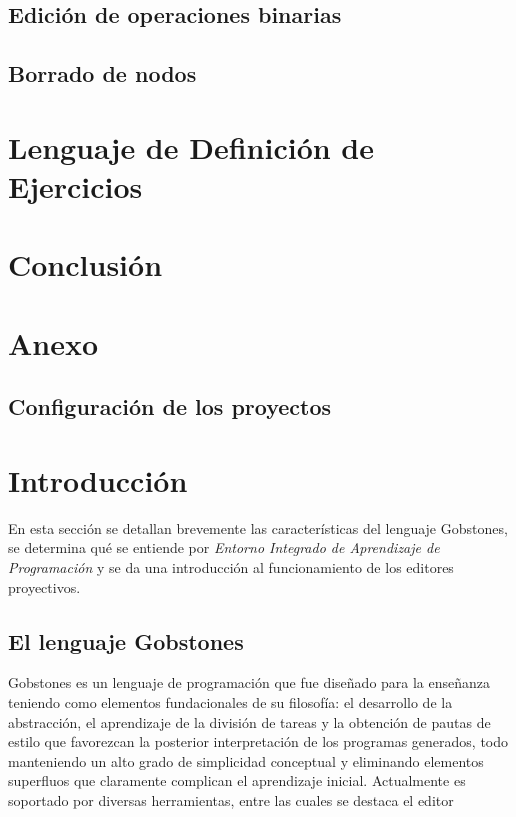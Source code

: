 \subsection{Edición de operaciones binarias}
\subsection{Borrado de nodos}

\section{Lenguaje de Definición de Ejercicios}

\section{Conclusión}

\section{Anexo}
\subsection{Configuración de los proyectos}


\section{Introducción}

En esta sección se detallan brevemente las características del lenguaje Gobstones, se determina qué se entiende por \textit{Entorno Integrado de Aprendizaje de Programación} y se da una introducción al funcionamiento de los editores proyectivos.


\subsection{El lenguaje Gobstones}

Gobstones es un lenguaje de programación que fue diseñado para la enseñanza teniendo como elementos fundacionales de su filosofía: el desarrollo de la abstracción, el aprendizaje de la división de tareas y la obtención de pautas de estilo que favorezcan la posterior interpretación de los programas generados, todo manteniendo un alto grado de simplicidad conceptual y eliminando elementos superfluos que claramente complican el aprendizaje inicial. 
Actualmente es soportado por diversas herramientas, entre las cuales se destaca el editor \cite{PyGobstones}

